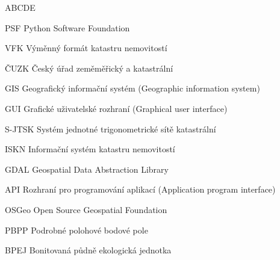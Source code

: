
\begin{seznamzkratek}{ABCDE}

		  {PSF}
	      {Python Software Foundation}
	      
		  {VFK}
	      {Výměnný formát katastru nemovitostí}
	      
	      {ČUZK}
	      {Český úřad zeměměřický a katastrální}

	      {GIS}
	      {Geografický informační systém (Geographic information system)}
	         
	      {GUI}
	      {Grafické uživatelské rozhraní (Graphical user interface)}
	           
	      {S-JTSK}
	      {Systém jednotné trigonometrické sítě katastrální}
	  
	      {ISKN}
	      {Informační systém katastru nemovitostí}        
	      
	      {GDAL}
	      {Geospatial Data Abstraction Library}
	      
	      {API}
	      {Rozhraní pro programování aplikací (Application program interface)}    
	      
	      {OSGeo}
	      {Open Source Geospatial Foundation}
	      
	      {PBPP}
	      {Podrobné polohové bodové pole}

	      {BPEJ}
	      {Bonitovaná půdně ekologická jednotka}
	        
\end{seznamzkratek}
